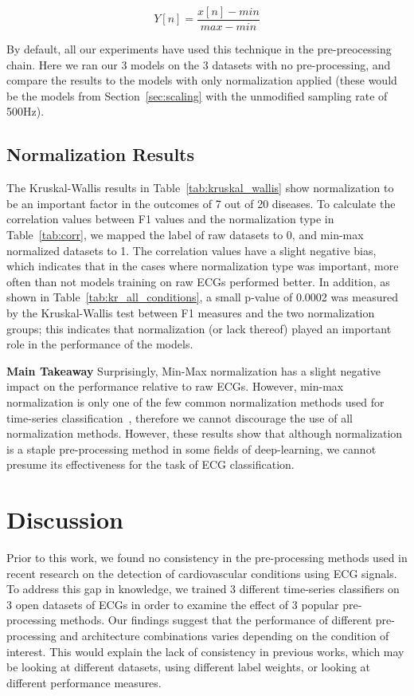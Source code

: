\documentclass[pmlr,twocolumn]{jmlr}%
\begin{document}
\[ Y[n] = \frac{x[n]-min}{max-min} \]

By default, all our experiments have used this technique in the pre-preocessing chain. Here we ran our 3 models on the 3 datasets with no pre-processing, and compare the results to the models with only normalization applied (these would be the models from Section~\ref{sec:scaling} with the unmodified sampling rate of 500Hz). 

\subsection{Normalization Results}
The Kruskal-Wallis results in Table~\ref{tab:kruskal_wallis} show normalization to be an important factor in the outcomes of 7 out of 20 diseases. To calculate the correlation values between F1 values and the normalization type in Table~\ref{tab:corr}, we mapped the label of raw datasets to 0, and min-max normalized datasets to 1. The correlation values have a slight negative bias, which indicates that in the cases where normalization type was important, more often than not models training on raw ECGs performed better. In addition, as shown in Table~\ref{tab:kr_all_conditions}, a small p-value of 0.0002 was measured by the Kruskal-Wallis test between F1 measures and the two normalization groups; this indicates that normalization (or lack thereof) played an important role in the performance of the models. 

\textbf{Main Takeaway} Surprisingly, Min-Max normalization has a slight negative impact on the performance relative to raw ECGs. However, min-max normalization is only one
of the few common normalization methods used for time-series classification~\citep{uwaechia2021comprehensive}, therefore we cannot discourage the use of all normalization methods. However, these results show that although normalization is a staple pre-processing method in some fields of deep-learning, we cannot presume its effectiveness for the task of ECG classification.


\section{Discussion}
Prior to this work, we found no consistency in the pre-processing methods used in recent research on the detection of cardiovascular conditions using ECG signals. To address this gap in knowledge, we trained 3 different time-series classifiers on 3 open datasets of ECGs in order to examine the effect of 3 popular pre-processing methods. Our findings suggest that the performance of different pre-processing and architecture combinations varies depending on the condition of interest. This would explain the lack of consistency in previous works, which may be looking at different datasets, using different label weights, or looking at different performance measures. 
\end{document}
